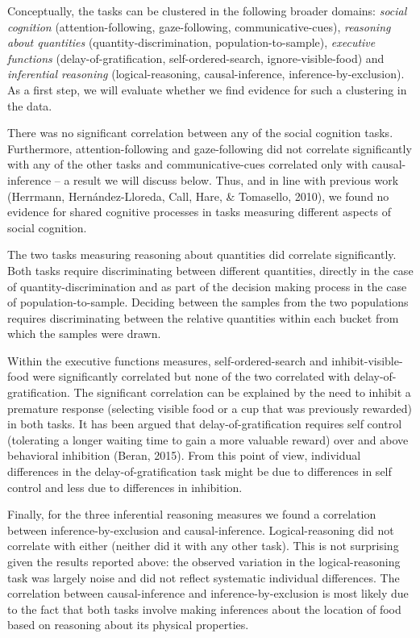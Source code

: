 \documentclass[
  man,floatsintext]{apa6}
\begin{document}
Conceptually, the tasks can be clustered in the following broader domains: \emph{social cognition} (attention-following, gaze-following, communicative-cues), \emph{reasoning about quantities} (quantity-discrimination, population-to-sample), \emph{executive functions} (delay-of-gratification, self-ordered-search, ignore-visible-food) and \emph{inferential reasoning} (logical-reasoning, causal-inference, inference-by-exclusion). As a first step, we will evaluate whether we find evidence for such a clustering in the data.

There was no significant correlation between any of the social cognition tasks. Furthermore, attention-following and gaze-following did not correlate significantly with any of the other tasks and communicative-cues correlated only with causal-inference -- a result we will discuss below. Thus, and in line with previous work (Herrmann, Hernández-Lloreda, Call, Hare, \& Tomasello, 2010), we found no evidence for shared cognitive processes in tasks measuring different aspects of social cognition.

The two tasks measuring reasoning about quantities did correlate significantly. Both tasks require discriminating between different quantities, directly in the case of quantity-discrimination and as part of the decision making process in the case of population-to-sample. Deciding between the samples from the two populations requires discriminating between the relative quantities within each bucket from which the samples were drawn.

Within the executive functions measures, self-ordered-search and inhibit-visible-food were significantly correlated but none of the two correlated with delay-of-gratification. The significant correlation can be explained by the need to inhibit a premature response (selecting visible food or a cup that was previously rewarded) in both tasks. It has been argued that delay-of-gratification requires self control (tolerating a longer waiting time to gain a more valuable reward) over and above behavioral inhibition (Beran, 2015). From this point of view, individual differences in the delay-of-gratification task might be due to differences in self control and less due to differences in inhibition.

Finally, for the three inferential reasoning measures we found a correlation between inference-by-exclusion and causal-inference. Logical-reasoning did not correlate with either (neither did it with any other task). This is not surprising given the results reported above: the observed variation in the logical-reasoning task was largely noise and did not reflect systematic individual differences. The correlation between causal-inference and inference-by-exclusion is most likely due to the fact that both tasks involve making inferences about the location of food based on reasoning about its physical properties.
\end{document}
